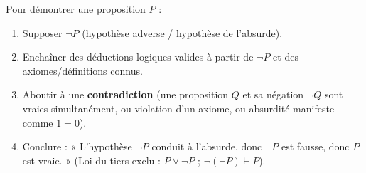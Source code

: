 \documentclass[11pt]{article}
\begin{document}
\begin{methode}
Pour démontrer une proposition $P$ :
\begin{enumerate}
    \item Supposer $\neg P$ (hypothèse adverse / hypothèse de l'absurde).
    \item Enchaîner des déductions logiques valides à partir de $\neg P$ et des axiomes/définitions connus.
    \item Aboutir à une \textbf{contradiction} (une proposition $Q$ et sa négation $\neg Q$ sont vraies simultanément, ou violation d'un axiome, ou absurdité manifeste comme $1=0$).
    \item Conclure : « L'hypothèse $\neg P$ conduit à l'absurde, donc $\neg P$ est fausse, donc $P$ est vraie. » (Loi du tiers exclu : $P \lor \neg P$ ; $\neg(\neg P) \vdash P$).
\end{enumerate}
\end{methode}
\end{document}
